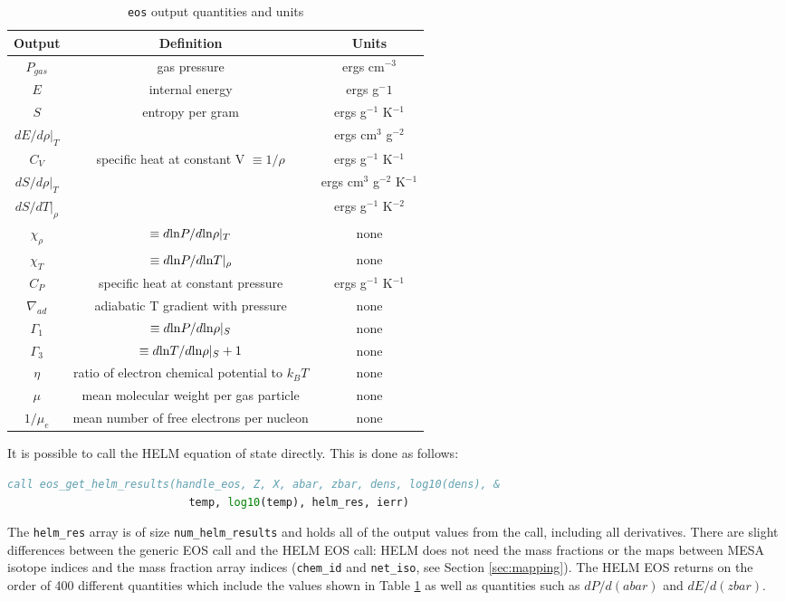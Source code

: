 \begin{table}[h]
\begin{center}
\begin{tabular}{ccc}
Output & Definition & Units \\ \hline
$P_{gas}$ & gas pressure & ergs cm$^{-3}$ \\
$E$ & internal energy & ergs g$^-{1}$ \\
$S$ & entropy per gram & ergs g$^{-1}$ K$^{-1}$ \\
$dE/d\rho|_T$ & & ergs cm$^3$ g$^{-2}$ \\
$C_V$ & specific heat at constant V $\equiv 1/\rho$ & ergs g$^{-1}$ K$^{-1}$ \\
$dS/d\rho|_T$ & & ergs cm$^3$ g$^{-2}$ K$^{-1}$ \\
$dS/dT|_\rho$ & & ergs g$^{-1}$ K$^{-2}$ \\
$\chi_\rho$ & $\equiv d{\rm ln}P/d{\rm ln}\rho|_T$ & none \\
$\chi_T$ & $\equiv d{\rm ln}P/d{\rm ln}T|_\rho$ & none \\
$C_P$ & specific heat at constant pressure & ergs g$^{-1}$ K$^{-1}$ \\
$\nabla_{ad}$ & adiabatic T gradient with pressure & none \\
$\Gamma_1$ & $\equiv d{\rm ln}P/d{\rm ln}\rho|_S$ & none \\
$\Gamma_3$ & $\equiv d{\rm ln}T/d{\rm ln}\rho|_S + 1$ & none \\
$\eta$ & ratio of electron chemical potential to $k_BT$ & none \\
$\mu$ & mean molecular weight per gas particle & none \\
$1/\mu_e$ & mean number of free electrons per nucleon & none \\ \hline
\end{tabular}
\caption{{\tt eos} output quantities and units}
\label{tab:res}
\end{center}
\end{table}

It is possible to call the HELM equation of state directly. This is done as 
follows:
\begin{lstlisting}[language=fortran,mathescape=false]
  call eos_get_helm_results(handle_eos, Z, X, abar, zbar, dens, log10(dens), &
                            temp, log10(temp), helm_res, ierr)
\end{lstlisting}
The {\tt helm\_res} array is of size {\tt num\_helm\_results} and holds all 
of the output 
values from the call, including all derivatives. 
There are slight differences between the generic EOS call and the HELM EOS 
call: HELM does not need the mass fractions or the maps between 
{\sf MESA} isotope indices and the mass fraction array indices ({\tt chem\_id} 
and {\tt net\_iso}, see Section \ref{sec:mapping}). The HELM EOS returns on 
the order of 400 different quantities which include the values shown in 
Table \ref{tab:res} as well as quantities such as $dP/d(abar)$ and 
$dE/d(zbar)$. 

